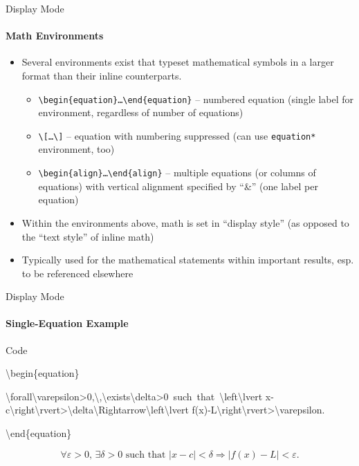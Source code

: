 \documentclass{beamer}
\begin{document}
\begin{frame}{Display Mode}
\framesubtitle{Math Environments}
	\begin{itemize}
		\item Several environments exist that typeset mathematical symbols in a larger format than their inline counterparts.
			\begin{itemize}
				\item \texttt{\textbackslash begin\{equation\}\dots\textbackslash end\{equation\}} -- numbered equation (single label for environment, regardless of number of equations)
				\item \texttt{\textbackslash[\dots\textbackslash]} -- equation with numbering suppressed (can use \texttt{equation*} environment, too)
				\item \texttt{\textbackslash begin\{align\}\dots\textbackslash end\{align\}} -- multiple equations (or columns of equations) with vertical alignment specified by ``\&'' (one label per equation)
			\end{itemize}
		\item<2-> Within the environments above, math is set in ``display style'' (as opposed to the ``text style'' of inline math)
		\item<3-> Typically used for the mathematical statements within important results, esp. to be referenced elsewhere
	\end{itemize}
\end{frame}

\begin{frame}{Display Mode}
\framesubtitle{Single-Equation Example}
	\begin{exampleblock}{Code}
		\begin{semiverbatim}
		\textbackslash begin\{equation\}
		
		\textbackslash forall\textbackslash varepsilon>0,\textbackslash,\textbackslash exists\textbackslash delta>0\mbox{ such that }\textbackslash left\textbackslash lvert x-c\textbackslash right\textbackslash rvert>\textbackslash delta\textbackslash Rightarrow\textbackslash left\textbackslash lvert f(x)-L\textbackslash right\textbackslash rvert>\textbackslash varepsilon.
		
		\textbackslash end\{equation\}
		\end{semiverbatim}
	\end{exampleblock}
	
	\begin{equation}
		\forall\varepsilon>0,\,\exists\delta>0\mbox{ such that }\left\lvert x-c\right\rvert<\delta\Rightarrow\left\lvert f(x)-L\right\rvert<\varepsilon.
	\end{equation}
\end{frame}
\end{document}
